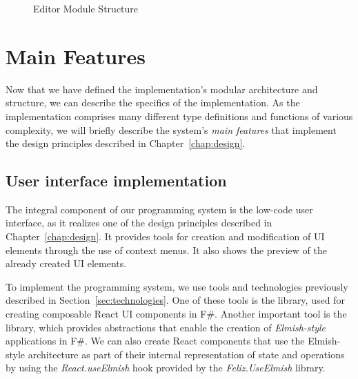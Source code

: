 \begin{figure}[htbp]
	\centering
	\caption{Editor Module Structure}
	\label{fig:editor-module-structure}
\end{figure}


\section{Main Features}
\label{sec:features}
Now that we have defined the implementation's modular architecture and structure, we can describe the specifics of the implementation.
As the implementation comprises many different type definitions and functions of various complexity,
we will briefly describe the system's \emph{main features} that implement the design principles described in Chapter~\ref{chap:design}.

\subsection{User interface implementation}

The integral component of our programming system is the low-code user interface, as it realizes one of the design principles described in Chapter~\ref{chap:design}.
It provides tools for creation and modification of UI elements through the use of context menus.
It also shows the preview of the already created UI elements.

To implement the programming system, we use tools and technologies previously described in Section~\ref{sec:technologies}.
One of these tools is the \citet{feliz} library, used for creating composable React UI components in F\#.
Another important tool is the \citet{elmish} library, which provides abstractions that enable the creation of \emph{Elmish-style} applications in F\#.
We can also create React components that use the Elmish-style architecture as part of their internal representation of state and operations
by using the \emph{React.useElmish} hook provided by the \emph{Feliz.UseElmish} library.

